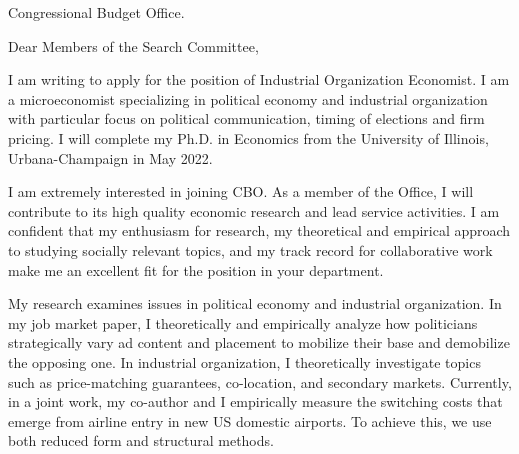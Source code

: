 \documentclass[12pt]{letter}
\begin{document}
\date{}
\begin{letter}{Congressional Budget Office.}

\opening{Dear Members of the Search Committee,}

I am writing to apply for the position of Industrial Organization Economist.
I am a microeconomist specializing in political economy and industrial organization with particular focus on political communication, timing of elections and firm pricing.
I will complete my Ph.D. in Economics from the University of Illinois, Urbana-Champaign in May 2022. 

I am extremely interested in joining CBO.
As a member of the Office, I will contribute to its high quality economic research and lead service activities.
%
I am confident that my enthusiasm for research, my theoretical and empirical approach to studying socially relevant topics, 
and my track record for collaborative work make me an excellent fit for the position in your department. 



My research examines issues in political economy and industrial organization.
In my job market paper, I theoretically and empirically analyze how politicians strategically vary ad content and placement to mobilize their base and demobilize the opposing one.
In industrial organization, I theoretically investigate topics such as price-matching guarantees, co-location, and secondary markets.
Currently, in a joint work, my co-author and I empirically measure the switching costs that emerge from airline entry in new US domestic airports.
To achieve this, we use both reduced form and structural methods.


\end{letter}
\end{document}

